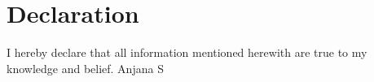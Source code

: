 \documentclass[11pt,a4paper,sans]{moderncv}        %
\begin{document}
\section{\textcolor{myblue}{Declaration}}

\vspace{6pt}

I hereby declare that all information mentioned herewith are true to my knowledge and belief.
\flushright Anjana S

\nocite{*}



\end{document}
